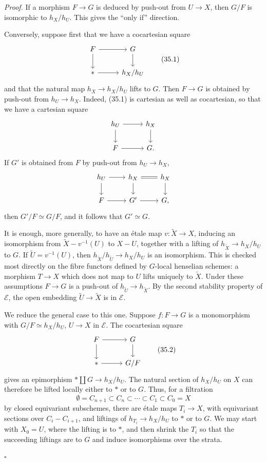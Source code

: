\documentclass[11pt]{article}
\newcommand{\pt}{*}
\theoremstyle{deligne}
\newenvironment{proofdel}{\noindent\textit{Proof.}}{\hfill$\square$}
\begin{document}
\begin{proofdel}
If a morphism \(F\to G\) is deduced by push-out from \(U\to X\), then \(G/F\) is isomorphic to \(h_X/h_U\). This gives the ``only if'' direction.

Conversely, suppose first that we have a cocartesian square
\[
\begin{tikzcd}[column sep=2.8em,row sep=1.8em]
F \arrow[r] \arrow[d] & G \arrow[d]\\
\pt \arrow[r] & h_X/h_U
\end{tikzcd}
\tag{35.1}
\]
and that the natural map \(h_X\to h_X/h_U\) lifts to \(G\). Then \(F\to G\) is obtained by push-out from \(h_U\to h_X\). Indeed, (35.1) is cartesian as well as cocartesian, so that we have a cartesian square
\[
\begin{tikzcd}[column sep=2.8em,row sep=1.8em]
h_U \arrow[r] \arrow[d] & h_X \arrow[d]\\
F \arrow[r] & G .
\end{tikzcd}
\]
If \(G'\) is obtained from \(F\) by push-out from \(h_U\to h_X\),
\[
\begin{tikzcd}[column sep=2.3em,row sep=1.6em]
h_U \arrow[r] \arrow[d] & h_X \arrow[d] \arrow[r,equal] & h_X \arrow[d]\\
F \arrow[r] & G' \arrow[r] & G ,
\end{tikzcd}
\]
then \(G'/F\simeq G/F\), and it follows that \(G'\simeq G\).

It is enough, more generally, to have an étale map \(v:\widetilde X\to X\), inducing an isomorphism from \(\widetilde X-v^{-1}(U)\) to \(X-U\), together with a lifting of \(h_{\widetilde X}\to h_X/h_U\) to \(G\). If \(\widetilde U=v^{-1}(U)\), then \(h_{\widetilde X}/h_{\widetilde U}\to h_X/h_U\) is an isomorphism. This is checked most directly on the fibre functors defined by \(G\)-local henselian schemes: a morphism \(T\to X\) which does not map to \(U\) lifts uniquely to \(\widetilde X\). Under these assumptions \(F\to G\) is a push-out of \(h_{\widetilde U}\to h_{\widetilde X}\). By the second stability property of \(\mathcal E\), the open embedding \(\widetilde U\to \widetilde X\) is in \(\mathcal E\).

We reduce the general case to this one. Suppose \(f:F\to G\) is a monomorphism with \(G/F\simeq h_X/h_U\), \(U\to X\) in \(\mathcal E\). The cocartesian square
\[
\begin{tikzcd}[column sep=2.8em,row sep=1.8em]
F \arrow[r] \arrow[d] & G \arrow[d]\\
\pt \arrow[r] & G/F
\end{tikzcd}
\tag{35.2}
\]
gives an epimorphism \(\pt\amalg G\to h_X/h_U\). The natural section of \(h_X/h_U\) on \(X\) can therefore be lifted locally either to \(\pt\) or to \(G\). Thus, for a filtration
\[
\emptyset=C_{n+1}\subset C_n\subset\cdots\subset C_1\subset C_0=X
\]
by closed equivariant subschemes, there are étale maps \(T_i\to X\), with equivariant sections over \(C_i-C_{i+1}\), and liftings of \(h_{T_i}\to h_X/h_U\) to \(\pt\) or to \(G\). We may start with \(X_0=U\), where the lifting is to \(\pt\), and then shrink the \(T_i\) so that the succeeding liftings are to \(G\) and induce isomorphisms over the strata.


\end{proofdel}
\end{document}
